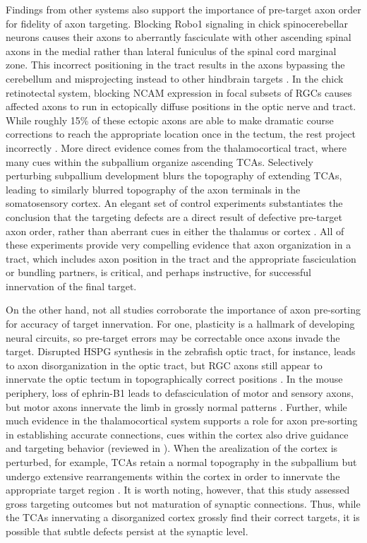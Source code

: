 Findings from other systems also support the importance of pre-target axon order for fidelity of axon targeting.
Blocking Robo1 signaling in chick spinocerebellar neurons causes their axons to aberrantly fasciculate with other ascending spinal axons in the medial rather than lateral funiculus of the spinal cord marginal zone.
This incorrect positioning in the tract results in the axons bypassing the cerebellum and misprojecting instead to other hindbrain targets \cite{sakai2012axon}.
In the chick retinotectal system, blocking NCAM expression in focal subsets of RGCs causes affected axons to run in ectopically diffuse positions in the optic nerve and tract.
While roughly 15\% of these ectopic axons are able to make dramatic course corrections to reach the appropriate location once in the tectum, the rest project incorrectly \cite{thanos1984fiber}.
More direct evidence comes from the thalamocortical tract, where many cues within the subpallium organize ascending TCAs.
Selectively perturbing subpallium development blurs the topography of extending TCAs, leading to similarly blurred topography of the axon terminals in the somatosensory cortex.
An elegant set of control experiments substantiates the conclusion that the targeting defects are a direct result of defective pre-target axon order, rather than aberrant cues in either the thalamus or cortex \cite{lokmane2013sensory}.
All of these experiments provide very compelling evidence that axon organization in a tract, which includes axon position in the tract and the appropriate fasciculation or bundling partners, is critical, and perhaps instructive, for successful innervation of the final target.

On the other hand, not all studies corroborate the importance of axon pre-sorting for accuracy of target innervation.
For one, plasticity is a hallmark of developing neural circuits, so pre-target errors may be correctable once axons invade the target.
Disrupted HSPG synthesis in the zebrafish optic tract, for instance, leads to axon disorganization in the optic tract, but RGC axons still appear to innervate the optic tectum in topographically correct positions \cite{lee2004axon}.
In the mouse periphery, loss of ephrin-B1 leads to defasciculation of motor and sensory axons, but motor axons innervate the limb in grossly normal patterns \cite{luxey2013eph}.
Further, while much evidence in the thalamocortical system supports a role for axon pre-sorting in establishing accurate connections, cues within the cortex also drive guidance and targeting behavior (reviewed in \cite{garel2014inputs}).
When the arealization of the cortex is perturbed, for example, TCAs retain a normal topography in the subpallium but undergo extensive rearrangements within the cortex in order to innervate the appropriate target region \cite{shimogori2005fibroblast}.
It is worth noting, however, that this study assessed gross targeting outcomes but not maturation of synaptic connections.
Thus, while the TCAs innervating a disorganized cortex grossly find their correct targets, it is possible that subtle defects persist at the synaptic level.

